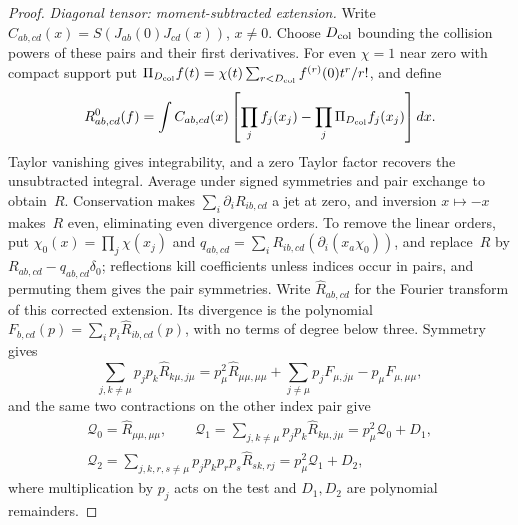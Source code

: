 \begin{proof}
\emph{Diagonal tensor: moment-subtracted extension.} Write $C_{ab,cd}(x)=S(J_{ab}(0)J_{cd}(x))$, $x\ne0$. Choose $D_{\rm col}$ bounding the collision powers of these pairs and their first derivatives. For even $\chi=1$ near zero with compact support put $\Pi_{D_{\rm col}}f(t)=\chi(t)\sum_{r<D_{\rm col}}f^{(r)}(0)t^r/r!$, and define
\begin{equation*}
R^0_{ab,cd}(f)=\int C_{ab,cd}(x)\left[\prod_jf_j(x_j)-\prod_j\Pi_{D_{\rm col}}f_j(x_j)\right]dx.
\end{equation*}
Taylor vanishing gives integrability, and a zero Taylor factor recovers the unsubtracted integral. Average under signed symmetries and pair exchange to obtain~$R$. Conservation makes $\sum_i\partial_iR_{ib,cd}$ a jet at zero, and inversion $x\mapsto-x$ makes~$R$ even, eliminating even divergence orders. To remove the linear orders, put $\chi_0(x)=\prod_j\chi(x_j)$ and $q_{ab,cd}=\sum_i R_{ib,cd}(\partial_i(x_a\chi_0))$, and replace~$R$ by $R_{ab,cd}-q_{ab,cd}\delta_0$; reflections kill coefficients unless indices occur in pairs, and permuting them gives the pair symmetries. Write $\widehat R_{ab,cd}$ for the Fourier transform of this corrected extension. Its divergence is the polynomial $F_{b,cd}(p)=\sum_ip_i\widehat R_{ib,cd}(p)$, with no terms of degree below three. Symmetry gives
\begin{equation*}
\sum_{j,k\ne \mu}p_jp_k\widehat R_{k\mu,j\mu}
=p_\mu^2\widehat R_{\mu\mu,\mu\mu}+\sum_{j\ne \mu}p_jF_{\mu,j\mu}-p_\mu F_{\mu,\mu\mu},
\end{equation*}
and the same two contractions on the other index pair give
\begin{equation}\label{eq:H-tensor-responses}
\begin{gathered}
\mathcal Q_0=\widehat R_{\mu\mu,\mu\mu},\qquad
\mathcal Q_1=\sum_{j,k\ne \mu}p_jp_k\widehat R_{k\mu,j\mu}=p_\mu^2\mathcal Q_0+D_1,\\
\mathcal Q_2=\sum_{j,k,r,s\ne \mu}p_jp_kp_rp_s\widehat R_{sk,rj}=p_\mu^2\mathcal Q_1+D_2,
\end{gathered}
\end{equation}
where multiplication by $p_j$ acts on the test and $D_1,D_2$ are polynomial remainders.


\end{proof}
